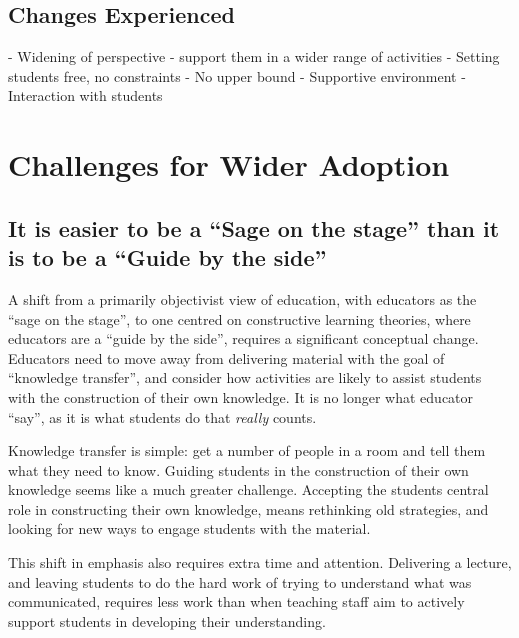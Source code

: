 
\subsection{Changes Experienced} %
\label{sub:changes_experienced}

- Widening of perspective - support them in a wider range of activities
- Setting students free, no constraints
- No upper bound
- Supportive environment
- Interaction with students




\section{Challenges for Wider Adoption} %
\label{sec:challenges_for_wider_adoption}

\subsection{It is easier to be a ``Sage on the stage'' than it is to be a ``Guide by the side''} %
\label{sub:adopting_constructive_learning_theories}

A shift from a primarily objectivist view of education, with educators as the ``sage on the stage'', to one centred on constructive learning theories, where educators are a ``guide by the side'', requires a significant conceptual change. Educators need to move away from delivering material with the goal of ``knowledge transfer'', and consider how activities are likely to assist students with the construction of their own knowledge. It is no longer what educator ``say'', as it is what students do that \emph{really} counts.

Knowledge transfer is simple: get a number of people in a room and tell them what they need to know. Guiding students in the construction of their own knowledge seems like a much greater challenge. Accepting the students central role in constructing their own knowledge, means rethinking old strategies, and looking for new ways to engage students with the material.

This shift in emphasis also requires extra time and attention. Delivering a lecture, and leaving students to do the hard work of trying to understand what was communicated, requires less work than when teaching staff aim to actively support students in developing their understanding.  


